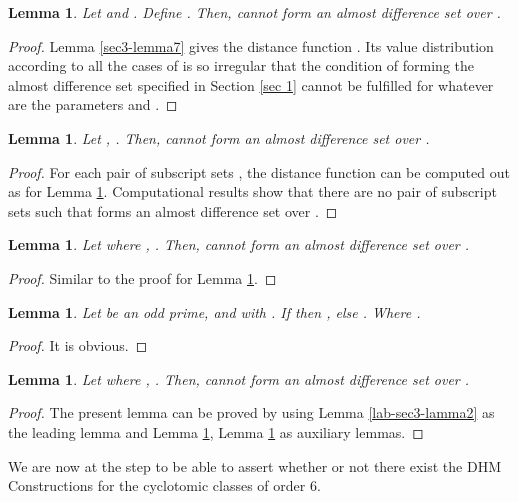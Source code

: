 \documentclass[letter]{ieice}
\newtheorem{sec3_lemma8}[sec3_lemma1]{Lemma}
\newtheorem{sec3_lemma9}[sec3_lemma1]{Lemma}
\newtheorem{sec3_lemma10}[sec3_lemma1]{Lemma}
\newtheorem{sec3_lemma11}[sec3_lemma1]{Lemma}
\newtheorem{sec3_lemma12}[sec3_lemma1]{Lemma}
\begin{document}
\begin{sec3_lemma8}\label{sec3-lemma8}
Let  and . Define . Then,  cannot form an almost difference set over .
\end{sec3_lemma8}                                      
\begin{proof}
Lemma \ref{sec3-lemma7} gives the distance function . Its value distribution according to all the cases of  is so irregular that the condition of forming the almost difference set specified in Section \ref{sec 1} cannot be fulfilled for whatever are the parameters  and .
\end{proof}
\begin{sec3_lemma9}\label{sec3-lemma9}
Let ,  . Then,  cannot form an almost difference set over .
\end{sec3_lemma9}
\begin{proof}
For each pair of subscript sets , the distance function  can be computed out as for  Lemma \ref{sec3-lemma9}. Computational results show that there are no pair of subscript sets  such that    forms an almost difference set over .
\end{proof}
\begin{sec3_lemma10}\label{sec3-lemma10}
Let  where ,  . Then,  cannot form an almost difference set over .
\end{sec3_lemma10}
\begin{proof}
Similar to the proof for Lemma \ref{sec3-lemma9}.
\end{proof}

\begin{sec3_lemma11}\label{sec3-lemma11}
Let  be an odd prime, and  with . If  then , else  . Where .
\end{sec3_lemma11} 
\begin{proof}
It is obvious.
\end{proof}

\begin{sec3_lemma12}\label{sec3-lemma12}
Let  where ,  . Then,  cannot form an almost difference set over .
\end{sec3_lemma12}
\begin{proof}
The present lemma can be proved by using Lemma \ref{lab-sec3-lamma2} as the leading lemma and Lemma \ref{sec3-lemma10}, Lemma \ref{sec3-lemma11} as auxiliary lemmas.
\end{proof}

We are now at the step to be able to assert whether or not there exist the DHM Constructions for the cyclotomic classes of order 6.
\end{document}
